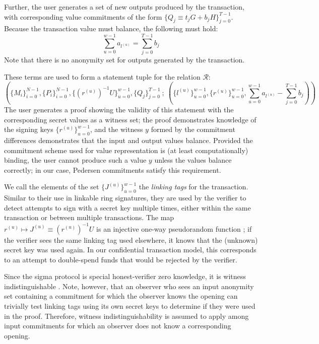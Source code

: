 \documentclass{article}
\newcommand{\sumu}{\sum_{u=0}^{w-1}}
\theoremstyle{definition}
\begin{document}
Further, the user generates a set of new outputs produced by the transaction, with corresponding value commitments of the form $\{Q_j \equiv t_jG + b_jH\}_{j=0}^{T-1}$.
Because the transaction value must balance, the following must hold: $$\sum_{u=0}^{w-1} a_{l^{(u)}} = \sum_{j=0}^{T-1} b_j$$
Note that there is no anonymity set for outputs generated by the transaction.

These terms are used to form a statement tuple for the relation $\mathcal{R}$:
$$\left( \{M_i\}_{i=0}^{N-1}, \{P_i\}_{i=0}^{N-1}, \{(r^{(u)})^{-1}U\}_{u=0}^{w-1}, \{Q_j\}_{j=0}^{T-1} \: ; \: \left( \{l^{(u)}\}_{u=0}^{w-1}, \{r^{(u)}\}_{u=0}^{w-1}, \sumu a_{l^{(u)}} - \sum_{j=0}^{T-1} b_j \right) \right)$$
The user generates a proof showing the validity of this statement with the corresponding secret values as a witness set; the proof demonstrates knowledge of the signing keys $\{r^{(u)}\}_{u=0}^{w-1}$, and the witness $y$ formed by the commitment differences demonstrates that the input and output values balance.
Provided the commitment scheme used for value representation is (at least computationally) binding, the user cannot produce such a value $y$ unless the values balance correctly; in our case, Pedersen commitments satisfy this requirement.

We call the elements of the set $\{J^{(u)}\}_{u=0}^{w-1}$ the \textit{linking tags} for the transaction.
Similar to their use in linkable ring signatures, they are used by the verifier to detect attempts to sign with a secret key multiple times, either within the same transaction or between multiple transactions.
The map $r^{(u)} \mapsto J^{(u)} \equiv (r^{(u)})^{-1}U$ is an injective one-way pseudorandom function \cite{dodis}; if the verifier sees the same linking tag used elsewhere, it knows that the (unknown) secret key was used again.
In our confidential transaction model, this corresponds to an attempt to double-spend funds that would be rejected by the verifier.

Since the sigma protocol is special honest-verifier zero knowledge, it is witness indistinguishable \cite{cramer}.
Note, however, that an observer who sees an input anonymity set containing a commitment for which the observer knows the opening can trivially test linking tags using its own secret keys to determine if they were used in the proof.
Therefore, witness indistinguishability is assumed to apply among input commitments for which an observer does not know a corresponding opening.
\end{document}
